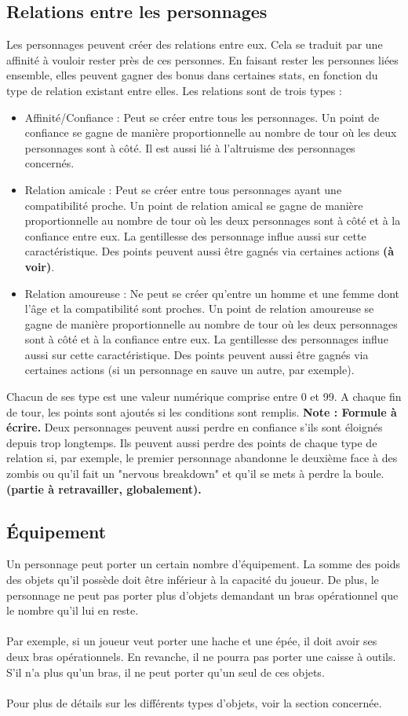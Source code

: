 \subsection{Relations entre les personnages}
Les personnages peuvent créer des relations entre eux. Cela se traduit par une affinité à vouloir rester près de ces personnes. En faisant rester les personnes liées ensemble, elles peuvent gagner des bonus dans certaines stats, en fonction du type de relation existant entre elles. Les relations sont de trois types : 
\begin{itemize}
  \item Affinité/Confiance : Peut se créer entre tous les personnages. Un point de confiance se gagne de manière proportionnelle au nombre de tour où les deux personnages sont à côté. Il est aussi lié à l'altruisme des personnages concernés.
  \item Relation amicale : Peut se créer entre tous personnages ayant une compatibilité proche. Un point de relation amical se gagne de manière proportionnelle au nombre de tour où les deux personnages sont à côté et à la confiance entre eux. La gentillesse des personnage influe aussi sur cette caractéristique. Des points peuvent aussi être gagnés via certaines actions \textbf{(à voir)}. 
    \item Relation amoureuse : Ne peut se créer qu'entre un homme et une femme dont l'âge et la compatibilité sont proches. Un point de relation amoureuse se gagne de manière proportionnelle au nombre de tour où les deux personnages sont à côté et à la confiance entre eux. La gentillesse des personnages influe aussi sur cette caractéristique. Des points peuvent aussi être gagnés via certaines actions (si un personnage en sauve un autre, par exemple). 
\end{itemize}
Chacun de ses type est une valeur numérique comprise entre 0 et 99. A chaque fin de tour, les points sont ajoutés si les conditions sont remplis. \textbf{Note : Formule à écrire.} Deux personnages peuvent aussi perdre en confiance s'ils sont éloignés depuis trop longtemps. Ils peuvent aussi perdre des points de chaque type de relation si, par exemple, le premier personnage abandonne le deuxième face à des zombis ou qu'il fait un "nervous breakdown" et qu'il se mets à perdre la boule. \textbf{(partie à retravailler, globalement).}
\subsection{Équipement}
Un personnage peut porter un certain nombre d'équipement. La somme des poids des objets qu'il possède doit être inférieur à la capacité du joueur. De plus, le personnage ne peut pas porter plus d'objets demandant un bras opérationnel que le nombre qu'il lui en reste.
\\\\
Par exemple, si un joueur veut porter une hache et une épée, il doit avoir ses deux bras opérationnels. En revanche, il ne pourra pas porter une caisse à outils. S'il n'a plus qu'un bras, il ne peut porter qu'un seul de ces objets.
\\\\
Pour plus de détails sur les différents types d'objets, voir la section concernée.
